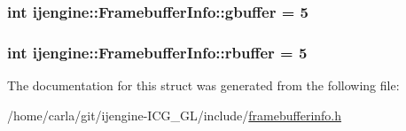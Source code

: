 \hypertarget{structijengine_1_1FramebufferInfo_a8e09a95dc7d365ac5cb77e5a87e876a0}{
\subsubsection[{gbuffer}]{\setlength{\rightskip}{0pt plus 5cm}int ijengine\-::\-Framebuffer\-Info\-::gbuffer = 5}}\label{structijengine_1_1FramebufferInfo_a8e09a95dc7d365ac5cb77e5a87e876a0}
\hypertarget{structijengine_1_1FramebufferInfo_aa8891e2879a75364bed1b6559ceaf575}{
\subsubsection[{rbuffer}]{\setlength{\rightskip}{0pt plus 5cm}int ijengine\-::\-Framebuffer\-Info\-::rbuffer = 5}}\label{structijengine_1_1FramebufferInfo_aa8891e2879a75364bed1b6559ceaf575}


The documentation for this struct was generated from the following file\-:\begin{DoxyCompactItemize}
\item 
/home/carla/git/ijengine-\/\-I\-C\-G\-\_\-\-G\-L/include/\hyperlink{framebufferinfo_8h}{framebufferinfo.\-h}\end{DoxyCompactItemize}
